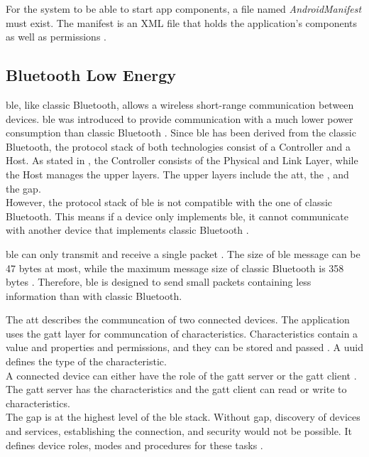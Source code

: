 For the system to be able to start app components, a file named \textit{AndroidManifest} must exist. The manifest is an XML file that holds the application's components as well as permissions \cite{AndroidFundamentals}.


\subsection{Bluetooth Low Energy}
\gls{ble}, like classic Bluetooth, allows a wireless short-range communication between devices. \gls{ble} was introduced to provide communication with a much lower power consumption than classic Bluetooth \cite{DBLP:journals/sensors/GomezOP12}. Since \gls{ble} has been derived from the classic Bluetooth, the protocol stack of both technologies consist of a Controller and a Host. As stated in \cite{DBLP:journals/sensors/GomezOP12}, the Controller consists of the Physical and Link Layer, while the Host manages the upper layers. The upper layers include the \gls{att}, the , and the \gls{gap}. \\
However, the protocol stack of \gls{ble} is not compatible with the one of classic Bluetooth. This means if a device only implements \gls{ble}, it cannot communicate with another device that implements classic Bluetooth \cite{DBLP:journals/sensors/GomezOP12}.

\gls{ble} can only transmit and receive a single packet \cite{DBLP:conf/woot/Ryan13}. The size of \gls{ble} message can be 47 bytes at most, while the maximum message size of classic Bluetooth is 358 bytes \cite{DBLP:journals/sensors/GomezOP12}. Therefore, \gls{ble} is designed to send small packets containing less information than with classic Bluetooth.

The \gls{att} describes the communcation of two connected devices. The application uses the \gls{gatt} layer for communcation of characteristics. Characteristics contain a value and properties and permissions, and they can be stored and passed \cite{BTGatt}. A \gls{uuid} defines the type of the characteristic. \\
A connected device can either have the role of the \gls{gatt} server or the \gls{gatt} client \cite{TIGatt}. The \gls{gatt} server has the characteristics and the \gls{gatt} client can read or write to characteristics. \\
The \gls{gap} is at the highest level of the \gls{ble} stack. Without \gls{gap}, discovery of devices and services, establishing the connection, and security would not be possible. It defines device roles, modes and procedures for these tasks \cite{DBLP:journals/sensors/GomezOP12}.


